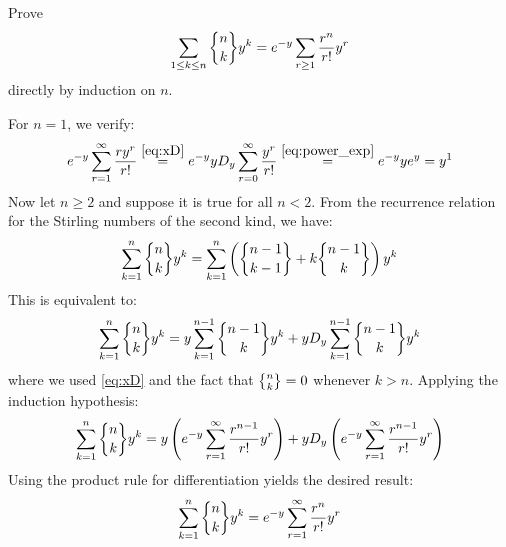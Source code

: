 \begin{exercise}
    Prove 
    \[
        \sum_{1\leq k\leq n}\stirlingSnd{n}{k} y^k = e^{-y}\sum_{r\geq 1}\frac{r^n}{r!}y^r  
    \]
    directly by induction on $n$.
\end{exercise}
\begin{solution}
    For $n=1$, we verify:
    \[
        e^{-y} \sum_{r=1}^\infty \frac{ry^r}{r!} \estep{\eqref{eq:xD}} e^{-y}yD_y \bsum[r] \frac{y^r}{r!}\estep{\eqref{eq:power_exp}} e^{-y}ye^{y} = y^1
    \]
    Now let $n\geq 2$ and suppose it is true for all $n< 2$. From the recurrence relation for the Stirling numbers of the second kind, we have:
    \[
        \sum_{k=1}^n \stirlingSnd{n}{k}y^k = \sum_{k=1}^n \left( \stirlingSnd{n-1}{k-1} + k\stirlingSnd{n-1}{k}\right)y^k
    \]
    This is equivalent to:
    \[
        \sum_{k=1}^n \stirlingSnd{n}{k}y^k = y \sum_{k=1}^{n-1} \stirlingSnd{n-1}{k}y^k + yD_y \sum_{k=1}^{n-1} \stirlingSnd{n-1}{k} y^k 
    \]
    where we used \eqref{eq:xD} and the fact that $\stirlingSnd{n}{k} = 0$ whenever $k > n$.
    Applying the induction hypothesis:
    \[
        \sum_{k=1}^n \stirlingSnd{n}{k}y^k = y \left(e^{-y}\sum_{r=1}^\infty\frac{r^{n-1}}{r!}y^r\right) + y D_y \left(e^{-y}\sum_{r=1}^\infty\frac{r^{n-1}}{r!}y^r\right)
    \]
    Using the product rule for differentiation yields the desired result:
    \[
        \sum_{k=1}^n \stirlingSnd{n}{k}y^k = e^{-y}\sum_{r=1}^\infty\frac{r^n}{r!}y^r  
    \]
\end{solution}
